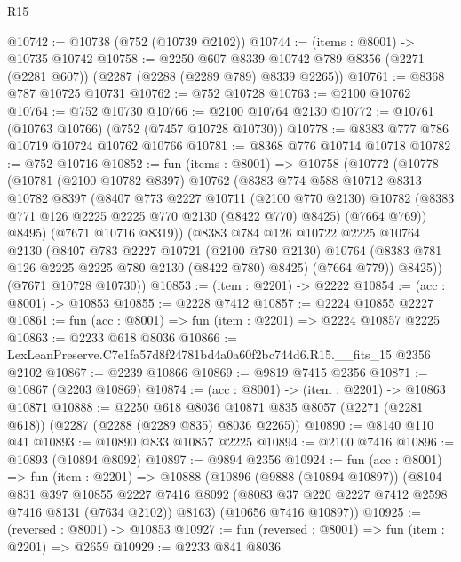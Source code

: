 \begin{lexlean}{R15}
\begin{coremodule}
@10742 := @10738 (@752 (@10739 @2102))
@10744 := (items : @8001) -> @10735 @10742
@10758 := @2250
    @607
    @8339
    @10742
    @789
    @8356
    (@2271 (@2281 @607))
    (@2287 (@2288 (@2289 @789) @8339 @2265))
@10761 := @8368 @787 @10725 @10731
@10762 := @752 @10728
@10763 := @2100 @10762
@10764 := @752 @10730
@10766 := @2100 @10764 @2130
@10772 := @10761 (@10763 @10766) (@752 (@7457 @10728 @10730))
@10778 := @8383 @777 @786 @10719 @10724 @10762 @10766
@10781 := @8368 @776 @10714 @10718
@10782 := @752 @10716
@10852 := fun (items : @8001) =>
  @10758
    (@10772
      (@10778
        (@10781
          (@2100 @10782 @8397)
          @10762
          (@8383
            @774
            @588
            @10712
            @8313
            @10782
            @8397
            (@8407
              @773
              @2227
              @10711
              (@2100 @770 @2130)
              @10782
              (@8383 @771 @126 @2225 @2225 @770 @2130 (@8422 @770) @8425)
              (@7664 @769))
            @8495)
          (@7671 @10716 @8319))
        (@8383
          @784
          @126
          @10722
          @2225
          @10764
          @2130
          (@8407
            @783
            @2227
            @10721
            (@2100 @780 @2130)
            @10764
            (@8383 @781 @126 @2225 @2225 @780 @2130 (@8422 @780) @8425)
            (@7664 @779))
          @8425))
      (@7671 @10728 @10730))
@10853 := (item : @2201) -> @2222
@10854 := (acc : @8001) -> @10853
@10855 := @2228 @7412
@10857 := @2224 @10855 @2227
@10861 := fun (acc : @8001) => fun (item : @2201) => @2224 @10857 @2225
@10863 := @2233 @618 @8036
@10866 := LexLeanPreserve.C7e1fa57d8f24781bd4a0a60f2bc744d6.R15.__fits_15 @2356 @2102
@10867 := @2239 @10866
@10869 := @9819 @7415 @2356
@10871 := @10867 (@2203 @10869)
@10874 := (acc : @8001) -> (item : @2201) -> @10863 @10871
@10888 := @2250
    @618
    @8036
    @10871
    @835
    @8057
    (@2271 (@2281 @618))
    (@2287 (@2288 (@2289 @835) @8036 @2265))
@10890 := @8140 @110 @41
@10893 := @10890 @833 @10857 @2225
@10894 := @2100 @7416
@10896 := @10893 (@10894 @8092)
@10897 := @9894 @2356
@10924 := fun (acc : @8001) =>
  fun (item : @2201) =>
  @10888
    (@10896
      (@9888 (@10894 @10897))
      (@8104
        @831
        @397
        @10855
        @2227
        @7416
        @8092
        (@8083 @37 @220 @2227 @7412 @2598 @7416 @8131 (@7634 @2102))
        @8163)
      (@10656 @7416 @10897))
@10925 := (reversed : @8001) -> @10853
@10927 := fun (reversed : @8001) => fun (item : @2201) => @2659
@10929 := @2233 @841 @8036

\end{coremodule}
\end{lexlean}

